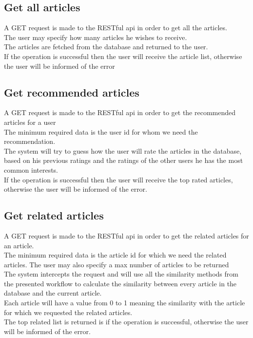 \subsection{Get all articles}
\label{sec:workflow-get-all-articles}
A GET request is made to the RESTful api in order to get all the articles.
\\ The user may specify how many articles he wishes to receive.
\\ The articles are fetched from the database and returned to the user.
\\ If the operation is successful then the user will receive the article list, otherwise the user will be informed of the error

\subsection{Get recommended articles}
\label{sec:workflow-get-recommended-articles}
A GET request is made to the RESTful api in order to get the recommended articles for a user
\\ The minimum required data is the user id for whom we need the recommendation.
\\ The system will try to guess how the user will rate the articles in the database, based on his previous ratings and the ratings of the other users he has the most common interests.
\\ If the operation is successful then the user will receive the top rated articles, otherwise the user will be informed of the error.

\subsection{Get related articles}
\label{sec:workflow-get-related-articles}
A GET request is made to the RESTful api in order to get the related articles for an article.
\\ The minimum required data is the article id for which we need the related articles. The user may also specify a max number of articles to be returned
\\ The system intercepts the request and will use all the similarity methods from the presented workflow to calculate the similarity between every article in the database and the current article.
\\ Each article will have a value from 0 to 1 meaning the similarity with the article for which we requested the related articles.
\\ The top related list is returned is if the operation is successful, otherwise the user will be informed of the error.


